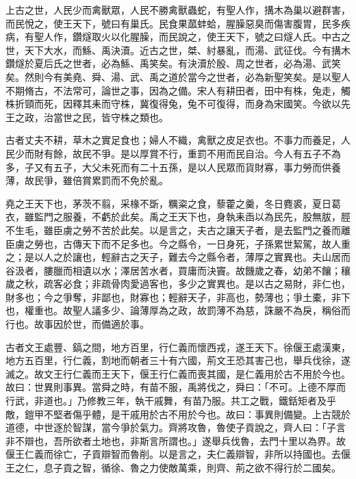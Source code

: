 
\begin{pinyinscope}
上古之世，人民少而禽獸眾，人民不勝禽獸蟲蛇，有聖人作，搆木為巢以避群害，而民悅之，使王天下，號曰有巢氏。民食果蓏蚌蛤，腥臊惡臭而傷害腹胃，民多疾病，有聖人作，鑽燧取火以化腥臊，而民說之，使王天下，號之曰燧人氏。中古之世，天下大水，而鯀、禹決瀆。近古之世，桀、紂暴亂，而湯、武征伐。今有搆木鑽燧於夏后氏之世者，必為鯀、禹笑矣。有決瀆於殷、周之世者，必為湯、武笑矣。然則今有美堯、舜、湯、武、禹之道於當今之世者，必為新聖笑矣。是以聖人不期脩古，不法常可，論世之事，因為之備。宋人有耕田者，田中有株，兔走，觸株折頸而死，因釋其耒而守株，冀復得兔，兔不可復得，而身為宋國笑。今欲以先王之政，治當世之民，皆守株之類也。

古者丈夫不耕，草木之實足食也；婦人不織，禽獸之皮足衣也。不事力而養足，人民少而財有餘，故民不爭。是以厚賞不行，重罰不用而民自治。今人有五子不為多，子又有五子，大父未死而有二十五孫，是以人民眾而貨財寡，事力勞而供養薄，故民爭，雖倍賞累罰而不免於亂。

堯之王天下也，茅茨不翦，采椽不斲，糲粢之食，藜藿之羹，冬日麑裘，夏日葛衣，雖監門之服養，不虧於此矣。禹之王天下也，身執耒臿以為民先，股無胈，脛不生毛，雖臣虜之勞不苦於此矣。以是言之，夫古之讓天子者，是去監門之養而離臣虜之勞也，古傳天下而不足多也。今之縣令，一日身死，子孫累世絜駕，故人重之；是以人之於讓也，輕辭古之天子，難去今之縣令者，薄厚之實異也。夫山居而谷汲者，膢臘而相遺以水；澤居苦水者，買庸而決竇。故饑歲之春，幼弟不饟；穰歲之秋，疏客必食；非疏骨肉愛過客也，多少之實異也。是以古之易財，非仁也，財多也；今之爭奪，非鄙也，財寡也；輕辭天子，非高也，勢薄也；爭土橐，非下也，權重也。故聖人議多少、論薄厚為之政，故罰薄不為慈，誅嚴不為戾，稱俗而行也。故事因於世，而備適於事。

古者文王處豐、鎬之間，地方百里，行仁義而懷西戎，遂王天下。徐偃王處漢東，地方五百里，行仁義，割地而朝者三十有六國，荊文王恐其害己也，舉兵伐徐，遂滅之。故文王行仁義而王天下，偃王行仁義而喪其國，是仁義用於古不用於今也。故曰：世異則事異。當舜之時，有苗不服，禹將伐之，舜曰：「不可。上德不厚而行武，非道也。」乃修教三年，執干戚舞，有苗乃服。共工之戰，鐵銛矩者及乎敵，鎧甲不堅者傷乎體，是干戚用於古不用於今也。故曰：事異則備變。上古競於道德，中世逐於智謀，當今爭於氣力。齊將攻魯，魯使子貢說之，齊人曰：「子言非不辯也，吾所欲者土地也，非斯言所謂也。」遂舉兵伐魯，去門十里以為界。故偃王仁義而徐亡，子貢辯智而魯削。以是言之，夫仁義辯智，非所以持國也。去偃王之仁，息子貢之智，循徐、魯之力使敵萬乘，則齊、荊之欲不得行於二國矣。


\end{pinyinscope}
